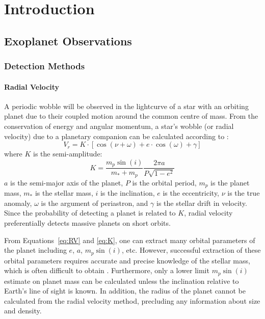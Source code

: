 \chapter{Introduction}
\label{chap:intro}

\section{Exoplanet Observations}
\subsection{Detection Methods}
\subsubsection{Radial Velocity}
\label{sec:RV}
A periodic wobble will be observed in the lightcurve of a star with an orbiting planet due to their coupled motion around the common centre of mass. 
From the conservation of energy and angular momentum, a star's wobble (or radial velocity) due to a planetary companion can be calculated according to \citep{Beauge2007}:
\begin{equation}
V_r = K \cdot [\cos(\nu + \omega) + e\cdot \cos(\omega) + \gamma]
\label{eq:RV}
\end{equation}
where $K$ is the semi-amplitude:
\begin{equation}
K = \frac{m_p \sin(i)}{m_* + m_p} \frac{2\pi a}{P\sqrt{1-e^2}}
\label{eq:K}
\end{equation}
$a$ is the semi-major axis of the planet, $P$ is the orbital period, $m_p$ is the planet mass, $m_*$ is the stellar mass, $i$ is the inclination, $e$ is the eccentricity, $\nu$ is the true anomaly, $\omega$ is the argument of periastron, and $\gamma$ is the stellar drift in velocity.
Since the probability of detecting a planet is related to $K$, radial velocity preferentially detects massive planets on short orbits. 

From Equations~\ref{eq:RV} and \ref{eq:K}, one can extract many orbital parameters of the planet including $e$, $a$, $m_p\sin(i)$, etc.
However, successful extraction of these orbital parameters requires accurate and precise knowledge of the stellar mass, which is often difficult to obtain \citep[e.g.][]{Brown2011}.
Furthermore, only a lower limit $m_p\sin(i)$ estimate on planet mass can be calculated unless the inclination relative to Earth's line of sight is known. 
In addition, the radius of the planet cannot be calculated from the radial velocity method, precluding any information about size and density.

